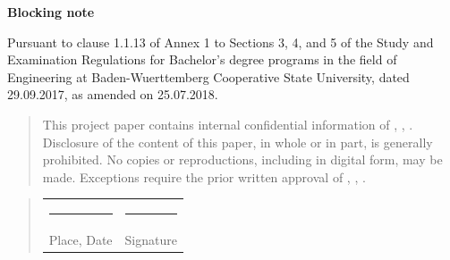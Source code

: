 \thispagestyle{empty}
\begin{center}
    \vspace*{1cm}
    \Huge\textbf{Blocking note}\\
    \vspace*{2cm}
    \normalsize
    \parbox{0.8\textwidth}{Pursuant to clause 1.1.13 of Annex 1 to Sections 3, 4, and 5 of the Study and Examination Regulations for Bachelor's degree programs in the field of Engineering at Baden-Wuerttemberg Cooperative State University, dated 29.09.2017, as amended on 25.07.2018.}
    \vspace{0.5cm}
    \begin{quotation}
        \parbox{0.8\textwidth}{\raggedright This project paper contains internal confidential information of \Company, \CompanyAddressStreet, \CompanyAddressCity. Disclosure of the content of this paper, in whole or in part, is generally prohibited. No copies or reproductions, including in digital form, may be made. Exceptions require the prior written approval of \Company, \CompanyAddressStreet, \CompanyAddressCity.}
    \end{quotation}
    \vspace*{1cm}
    \begin{quotation}
        \parbox{0.8\textwidth}{
        \begin{tabularx}{0.78\textwidth}{l@{\extracolsep\fill}l}
            \rule{4cm}{0.3mm}&\rule{4cm}{0.3mm}\\
            Place, Date & Signature
        \end{tabularx}}
    \end{quotation}
\end{center}
\newpage
